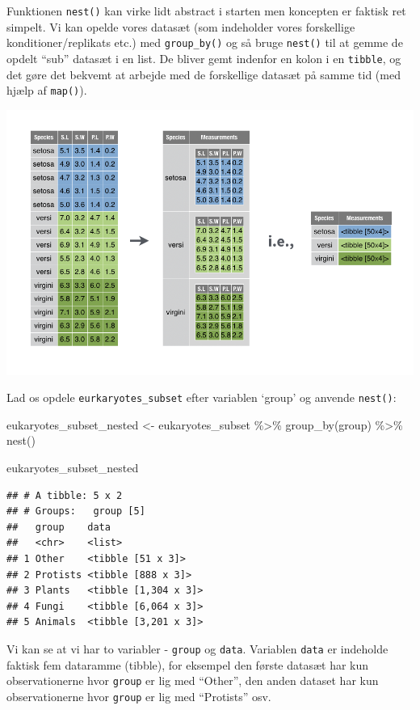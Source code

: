 \documentclass[
]{book}
\newenvironment{Shaded}{\begin{snugshade}}{\end{snugshade}}
\newcommand{\FunctionTok}[1]{\textcolor[rgb]{0.00,0.00,0.00}{#1}}
\newcommand{\NormalTok}[1]{#1}
\newcommand{\OtherTok}[1]{\textcolor[rgb]{0.56,0.35,0.01}{#1}}
\newcommand{\SpecialCharTok}[1]{\textcolor[rgb]{0.00,0.00,0.00}{#1}}
\begin{document}
Funktionen \texttt{nest()} kan virke lidt abstract i starten men koncepten er faktisk ret simpelt. Vi kan opelde vores datasæt (som indeholder vores forskellige konditioner/replikats etc.) med \texttt{group\_by()} og så bruge \texttt{nest()} til at gemme de opdelt ``sub'' datasæt i en list. De bliver gemt indenfor en kolon i en \texttt{tibble}, og det gøre det bekvemt at arbejde med de forskellige datasæt på samme tid (med hjælp af \texttt{map()}).

\includegraphics[width=1\linewidth]{plots/tidyr-nest}

Lad os opdele \texttt{eurkaryotes\_subset} efter variablen `group' og anvende \texttt{nest()}:

\begin{Shaded}
\begin{Highlighting}[]
\NormalTok{eukaryotes\_subset\_nested }\OtherTok{\textless{}{-}}\NormalTok{ eukaryotes\_subset }\SpecialCharTok{\%\textgreater{}\%} 
  \FunctionTok{group\_by}\NormalTok{(group) }\SpecialCharTok{\%\textgreater{}\%} 
  \FunctionTok{nest}\NormalTok{()}

\NormalTok{eukaryotes\_subset\_nested}
\end{Highlighting}
\end{Shaded}

\begin{verbatim}
## # A tibble: 5 x 2
## # Groups:   group [5]
##   group    data                
##   <chr>    <list>              
## 1 Other    <tibble [51 x 3]>   
## 2 Protists <tibble [888 x 3]>  
## 3 Plants   <tibble [1,304 x 3]>
## 4 Fungi    <tibble [6,064 x 3]>
## 5 Animals  <tibble [3,201 x 3]>
\end{verbatim}

Vi kan se at vi har to variabler - \texttt{group} og \texttt{data}. Variablen \texttt{data} er indeholde faktisk fem dataramme (tibble), for eksempel den første datasæt har kun observationerne hvor \texttt{group} er lig med ``Other'', den anden dataset har kun observationerne hvor \texttt{group} er lig med ``Protists'' osv.
\end{document}
